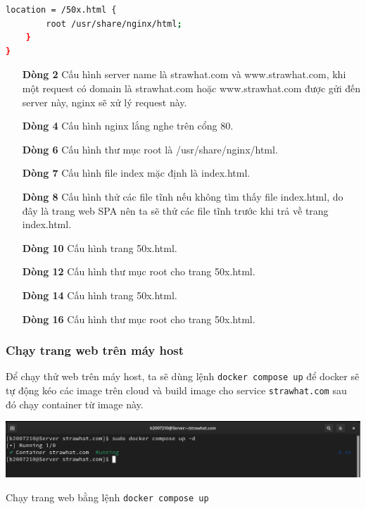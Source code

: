 \documentclass[a4paper, 11pt]{article}
\begin{document}
\begin{itemize}
\begin{lstlisting}[language=bash, caption={Nội dung file \texttt{/.nginx/nginx.conf}}]
    location = /50x.html {
        root /usr/share/nginx/html;
    }
}
\end{lstlisting}
          \begin{itemize}
              \item [\textbf{Dòng 2}] Cấu hình server name là strawhat.com và www.strawhat.com, khi một request có domain là strawhat.com hoặc www.strawhat.com được gửi đến server này, nginx sẽ xử lý request này.
              \item [\textbf{Dòng 4}] Cấu hình nginx lắng nghe trên cổng 80.
              \item [\textbf{Dòng 6}] Cấu hình thư mục root là /usr/share/nginx/html.
              \item [\textbf{Dòng 7}] Cấu hình file index mặc định là index.html.
              \item [\textbf{Dòng 8}] Cấu hình thử các file tĩnh nếu không tìm thấy file index.html, do đây là trang web SPA nên ta sẽ thử các file tĩnh trước khi trả về trang index.html.
              \item [\textbf{Dòng 10}] Cấu hình trang 50x.html.
              \item [\textbf{Dòng 12}] Cấu hình thư mục root cho trang 50x.html.
              \item [\textbf{Dòng 14}] Cấu hình trang 50x.html.
              \item [\textbf{Dòng 16}] Cấu hình thư mục root cho trang 50x.html.
          \end{itemize}

\end{itemize}

\subsubsection{Chạy trang web trên máy host}

Để chạy thử web trên máy host, ta sẽ dùng lệnh \texttt{docker compose up} để docker sẽ tự động kéo các image trên cloud và build image cho service \texttt{strawhat.com} sau đó chạy container từ image này.

\begin{minipage}
    {\linewidth}
    \captionsetup{type=figure}
    \centering
    \includegraphics[width=\linewidth]{images/run-webserver.png}
    \caption{Chạy trang web bằng lệnh \texttt{docker compose up}}
    \label{figure:run-webserver}
\end{minipage}
\end{document}
